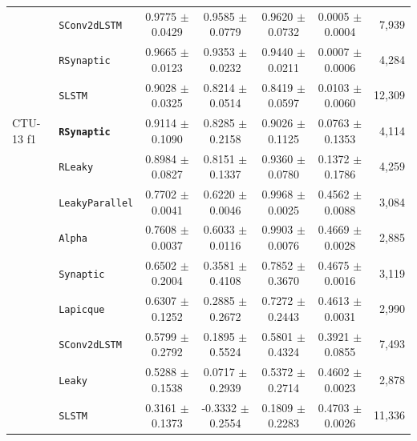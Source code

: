\begin{table}[t]
{\begin{tabular}{l l c c c c r}
 & \texttt{SConv2dLSTM} & 0.9775 $\pm$ 0.0429 & 0.9585 $\pm$ 0.0779 & 0.9620 $\pm$ 0.0732 & 0.0005 $\pm$ 0.0004 & 7{,}939 \\
 & \texttt{RSynaptic} & 0.9665 $\pm$ 0.0123 & 0.9353 $\pm$ 0.0232 & 0.9440 $\pm$ 0.0211 & 0.0007 $\pm$ 0.0006 & 4{,}284 \\
 & \texttt{SLSTM} & 0.9028 $\pm$ 0.0325 & 0.8214 $\pm$ 0.0514 & 0.8419 $\pm$ 0.0597 & 0.0103 $\pm$ 0.0060 & 12{,}309 \\
CTU-13 f1 & \textbf{\texttt{RSynaptic}} & 0.9114 $\pm$ 0.1090 & 0.8285 $\pm$ 0.2158 & 0.9026 $\pm$ 0.1125 & 0.0763 $\pm$ 0.1353 & 4{,}114 \\
 & \texttt{RLeaky} & 0.8984 $\pm$ 0.0827 & 0.8151 $\pm$ 0.1337 & 0.9360 $\pm$ 0.0780 & 0.1372 $\pm$ 0.1786 & 4{,}259 \\
 & \texttt{LeakyParallel} & 0.7702 $\pm$ 0.0041 & 0.6220 $\pm$ 0.0046 & 0.9968 $\pm$ 0.0025 & 0.4562 $\pm$ 0.0088 & 3{,}084 \\
 & \texttt{Alpha} & 0.7608 $\pm$ 0.0037 & 0.6033 $\pm$ 0.0116 & 0.9903 $\pm$ 0.0076 & 0.4669 $\pm$ 0.0028 & 2{,}885 \\
 & \texttt{Synaptic} & 0.6502 $\pm$ 0.2004 & 0.3581 $\pm$ 0.4108 & 0.7852 $\pm$ 0.3670 & 0.4675 $\pm$ 0.0016 & 3{,}119 \\
 & \texttt{Lapicque} & 0.6307 $\pm$ 0.1252 & 0.2885 $\pm$ 0.2672 & 0.7272 $\pm$ 0.2443 & 0.4613 $\pm$ 0.0031 & 2{,}990 \\
 & \texttt{SConv2dLSTM} & 0.5799 $\pm$ 0.2792 & 0.1895 $\pm$ 0.5524 & 0.5801 $\pm$ 0.4324 & 0.3921 $\pm$ 0.0855 & 7{,}493 \\
 & \texttt{Leaky} & 0.5288 $\pm$ 0.1538 & 0.0717 $\pm$ 0.2939 & 0.5372 $\pm$ 0.2714 & 0.4602 $\pm$ 0.0023 & 2{,}878 \\
 & \texttt{SLSTM} & 0.3161 $\pm$ 0.1373 & -0.3332 $\pm$ 0.2554 & 0.1809 $\pm$ 0.2283 & 0.4703 $\pm$ 0.0026 & 11{,}336 \\
\bottomrule
\end{tabular}}
\end{table}
